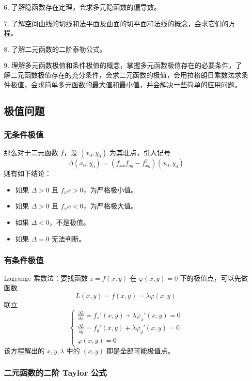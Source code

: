 6. 了解隐函数存在定理，会求多元隐函数的偏导数。

7. 了解空间曲线的切线和法平面及曲面的切平面和法线的概念，会求它们的方程。

8. 了解二元函数的二阶泰勒公式。

9. 理解多元函数极值和条件极值的概念，掌握多元函数极值存在的必要条件，了解二元函数极值存在的充分条件，会求二元函数的极值，会用拉格朗日乘数法求条件极值，会求简单多元函数的最大值和最小值，并会解决一些简单的应用问题。

\subsection{极值问题}

\subsubsection*{无条件极值}

那么对于二元函数 $f$，设 $(x_0, y_0)$ 为其驻点，引入记号
\[ \Delta(x_0, y_0) = (f_{xx} f_{yy} - f_{xy}^2)(x_0, y_0) \]
则有如下结论：
\begin{itemize}
	\item 如果 $\Delta > 0$ 且 $f_xx > 0$，为严格极小值。
	\item 如果 $\Delta > 0$ 且 $f_xx < 0$，为严格极大值。
	\item 如果 $\Delta < 0$，不是极值。
	\item 如果 $\Delta = 0$ 无法判断。
\end{itemize}

\subsubsection*{有条件极值}

Lagrange 乘数法：要找函数 $z = f(x, y)$ 在 $\varphi(x, y) = 0$ 下的极值点，可以先做函数
\[ L(x, y) = f(x, y) = \lambda \varphi(x, y) \]
联立
\[ \begin{cases}
		\frac{\partial L}{\partial x} = f_x'(x,y) + \lambda \varphi_x'(x, y) = 0 \\
		\frac{\partial L}{\partial y} = f_y'(x,y) + \lambda \varphi_y'(x, y) = 0 \\
		\varphi(x, y) = 0
	\end{cases} \]
该方程解出的 $x, y, \lambda$ 中的 $(x, y)$ 即是全部可能极值点。


\subsubsection*{二元函数的二阶 Taylor 公式}

